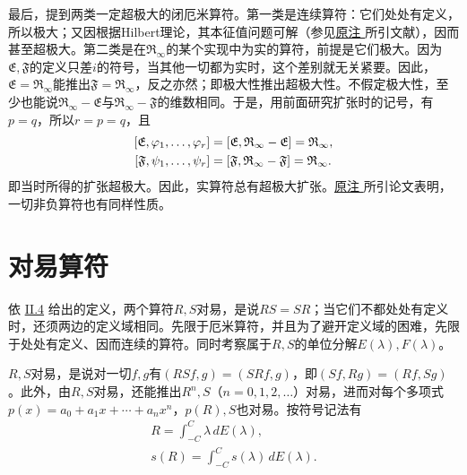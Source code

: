 \documentclass[fontsize=13pt,twoside,openany,headings=normal,parskip=false,bookmarkpackage=false,DIV=calc]{scrbook}
\begin{document}
最后，提到两类一定超极大的闭厄米算符。第一类是连续算符：它们处处有定义，所以极大；又因根据Hilbert理论，其本征值问题可解（参见\CJKglue \hyperlink{note-70}{原注 } 所引文献），因而甚至超极大。第二类是在$\mathfrak R_\infty$的某个实现中为实的算符，前提是它们极大。因为$\mathfrak E,\allowbreak \mathfrak F$的定义只差$i$的符号，当其他一切都为实时，这个差别就无关紧要。因此，$\mathfrak E=\mathfrak R_\infty$能推出$\mathfrak F=\mathfrak R_\infty$，反之亦然；即极大性推出超极大性。不假定极大性，至少也能说$\mathfrak R_\infty-\mathfrak E$与$\mathfrak R_\infty-\mathfrak F$的维数相同。于是，用前面研究扩张时的记号，有$p=q$，所以$r=p=q$，且
\begin{align*}\relax
[\mathfrak E,\varphi_1,\ldots,\varphi_r]&=[\mathfrak E,\mathfrak R_\infty-\mathfrak E]=\mathfrak R_\infty,\\
\relax[\mathfrak F,\psi_1,\ldots,\psi_r]&=[\mathfrak F,\mathfrak R_\infty-\mathfrak F]=\mathfrak R_\infty.
\end{align*}
即当时所得的扩张超极大。因此，实算符总有超极大扩张。\CJKglue \hyperlink{note-95}{原注 } 所引论文表明，一切非负算符也有同样性质。

\section{对易算符}\label{sec:II.10}
依 \hyperref[sec:II.4]{II.4} 给出的定义，两个算符$R,\allowbreak S$对易，是说$RS=SR$；当它们不都处处有定义时，还须两边的定义域相同。先限于厄米算符，并且为了避开定义域的困难，先限于处处有定义、因而连续的算符。同时考察属于$R,\allowbreak S$的单位分解$E(\lambda),\allowbreak F(\lambda)$。

$R,\allowbreak S$对易，是说对一切$f,\allowbreak g$有$(RSf,\allowbreak g)=(SRf,\allowbreak g)$，即$(Sf,\allowbreak Rg)=(Rf,\allowbreak Sg)$。此外，由$R,\allowbreak S$对易，还能推出$R^n,\allowbreak S$（$n=0,\allowbreak 1,\allowbreak 2,\allowbreak \ldots$）对易，进而对每个多项式$p(x)=a_0+a_1x+\cdots+a_nx^n$，$p(R),\allowbreak S$也对易。按符号记法有
\begin{gather*}
R=\int_{-C}^C\lambda\,dE(\lambda),\\
s(R)=\int_{-C}^Cs(\lambda)\,dE(\lambda).
\end{gather*}
\end{document}

